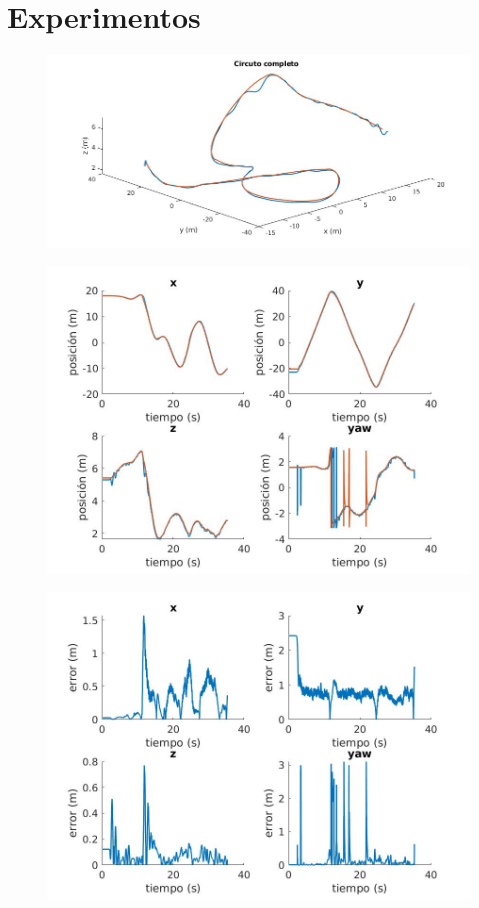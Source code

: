 \chapter{Experimentos}

\begin{figure}[htb!]
	\centering
	\includegraphics[width=\textwidth]{imagenes/circuitFigure}
	\caption{}
	\label{exp1:1}
\end{figure}

\begin{figure}[htb!]
	\centering
	\includegraphics[width=\textwidth]{imagenes/positionFigure}
	\caption{}
	\label{exp1:2}
\end{figure}

\begin{figure}[htb!]
	\centering
	\includegraphics[width=\textwidth]{imagenes/errorFigure}
	\caption{}
	\label{exp1:3}
\end{figure}

